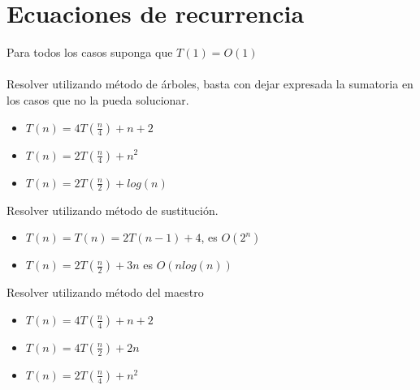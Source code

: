 \documentclass[twocolumn]{article}
\begin{document}
\section{Ecuaciones de recurrencia}

Para todos los casos suponga que $T(1) = O(1)$ \\\\

Resolver utilizando método de árboles, basta con dejar expresada la sumatoria en los casos que no la pueda solucionar.

\begin{itemize}
	\item $T(n) = 4T(\frac{n}{4}) + n + 2$
	\item $T(n) = 2T(\frac{n}{4}) + n^2$
	\item $T(n) = 2T(\frac{n}{2}) + log(n)$ 
\end{itemize}

Resolver utilizando método de sustitución.

\begin{itemize}
	\item $T(n) = T(n) = 2T(n-1) + 4$, es $O(2^n)$
	\item $T(n) = 2T(\frac{n}{2}) + 3n$ es $O(nlog(n))$
\end{itemize}


Resolver utilizando método del maestro


\begin{itemize}
	\item $T(n) = 4T(\frac{n}{4}) + n + 2$
	\item $T(n) = 4T(\frac{n}{2}) + 2n$
	\item $T(n) = 2T(\frac{n}{4}) + n^2$
\end{itemize}
\end{document}
